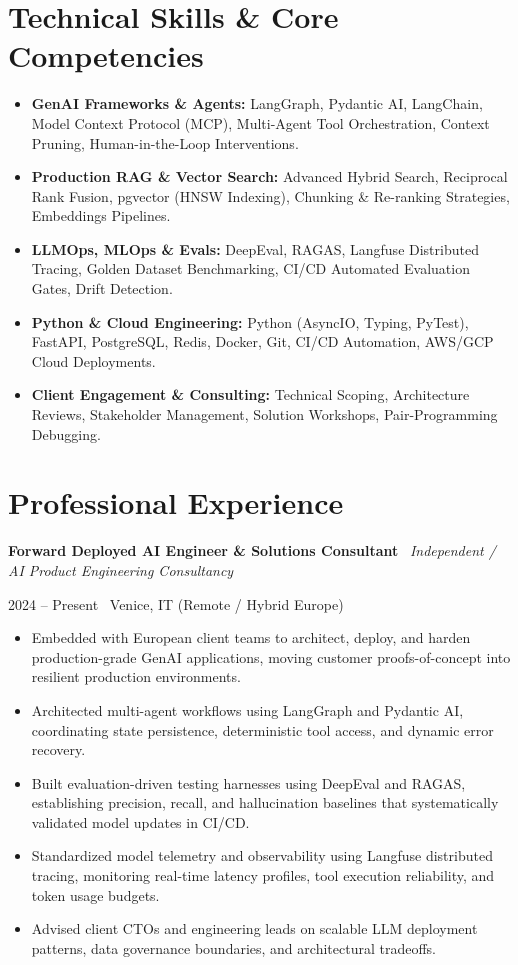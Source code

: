 \documentclass[a4paper,10pt]{article}
\newcommand{\role}[4]{%
  \vspace{2pt}\noindent
  \begin{minipage}[t]{0.70\textwidth}\raggedright\textbf{#1} \textbullet\ \textit{#3}\end{minipage}%
  \hfill
  \begin{minipage}[t]{0.28\textwidth}\raggedleft\footnotesize\color{gray}#2 \textbullet\ #4\end{minipage}%
  \vspace{1pt}%
}
\begin{document}
\section{Technical Skills \& Core Competencies}
\begin{itemize}[leftmargin=1.2em, itemsep=2pt]
  \item \textbf{GenAI Frameworks \& Agents:} LangGraph, Pydantic AI, LangChain, Model Context Protocol (MCP), Multi-Agent Tool Orchestration, Context Pruning, Human-in-the-Loop Interventions.
  \item \textbf{Production RAG \& Vector Search:} Advanced Hybrid Search, Reciprocal Rank Fusion, pgvector (HNSW Indexing), Chunking \& Re-ranking Strategies, Embeddings Pipelines.
  \item \textbf{LLMOps, MLOps \& Evals:} DeepEval, RAGAS, Langfuse Distributed Tracing, Golden Dataset Benchmarking, CI/CD Automated Evaluation Gates, Drift Detection.
  \item \textbf{Python \& Cloud Engineering:} Python (AsyncIO, Typing, PyTest), FastAPI, PostgreSQL, Redis, Docker, Git, CI/CD Automation, AWS/GCP Cloud Deployments.
  \item \textbf{Client Engagement \& Consulting:} Technical Scoping, Architecture Reviews, Stakeholder Management, Solution Workshops, Pair-Programming Debugging.
\end{itemize}

\section{Professional Experience}

\role{Forward Deployed AI Engineer \& Solutions Consultant}{2024 -- Present}{Independent / AI Product Engineering Consultancy}{Venice, IT (Remote / Hybrid Europe)}
\begin{itemize}
  \item Embedded with European client teams to architect, deploy, and harden production-grade GenAI applications, moving customer proofs-of-concept into resilient production environments.
  \item Architected multi-agent workflows using LangGraph and Pydantic AI, coordinating state persistence, deterministic tool access, and dynamic error recovery.
  \item Built evaluation-driven testing harnesses using DeepEval and RAGAS, establishing precision, recall, and hallucination baselines that systematically validated model updates in CI/CD.
  \item Standardized model telemetry and observability using Langfuse distributed tracing, monitoring real-time latency profiles, tool execution reliability, and token usage budgets.
  \item Advised client CTOs and engineering leads on scalable LLM deployment patterns, data governance boundaries, and architectural tradeoffs.
\end{itemize}
\end{document}
